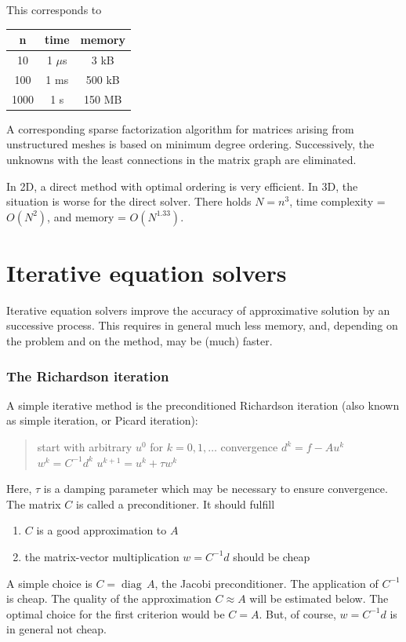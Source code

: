 This corresponds to
\begin{center}
\begin{tabular}{ccc}
        n & time & memory \\
        \hline
        10 & 1 $\mu$s & 3 kB \\
        100 & 1 ms & 500 kB \\
        1000 & 1 s & 150 MB 
\end{tabular}
\end{center}
\bigskip

A corresponding sparse factorization algorithm for matrices arising
from unstructured meshes is based on  minimum degree
ordering. Successively, the unknowns with the least connections in the
matrix graph are eliminated.

In 2D, a direct method with optimal ordering is very efficient. In 3D, 
the situation is  worse for the direct solver. There holds $N = n^3$,
time complexity = $O(N^2)$, and memory = $O(N^{1.33})$.

\section{Iterative equation solvers}

Iterative equation solvers improve the accuracy of approximative solution by an
successive process. This requires in general much less memory, and, 
depending on the problem and on the method, may be (much) faster.

\subsubsection{The Richardson iteration}
A simple iterative method is the preconditioned Richardson iteration 
(also known as simple iteration, or Picard iteration):

\begin{quote}
start with arbitrary $u^0$ \newline
for $k = 0, 1, \ldots$ convergence \newline
\hspace*{1cm} $d^k = f - A u^k$ \newline
\hspace*{1cm} $w^k = C^{-1} d^k$ \newline
\hspace*{1cm} $u^{k+1} = u^k + \tau w^k$ 
\end{quote}

Here, $\tau$ is a damping parameter which may be necessary to ensure
convergence. 
The matrix $C$ is called a preconditioner. It should fulfill
\begin{enumerate}
\item $C$ is a good approximation to $A$
\item the matrix-vector multiplication $w = C^{-1} d$ should be cheap
\end{enumerate}
A simple choice is $C = \operatorname{diag} \, A$, the Jacobi preconditioner. The 
application 
of $C^{-1}$ is cheap. The quality of the approximation $C \approx A$
will be estimated below. The optimal choice for the first criterion would be
$C = A$. But, of course, $w = C^{-1} d$ is in general not cheap.


